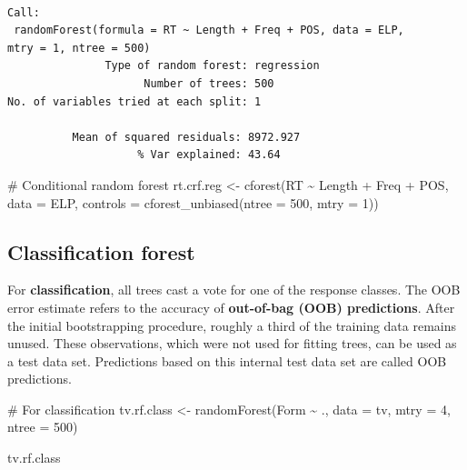 \documentclass[
  11pt,
  letterpaper,
  DIV=11,
  numbers=noendperiod]{scrreprt}
\newenvironment{Shaded}{\begin{snugshade}}{\end{snugshade}}
\newcommand{\AttributeTok}[1]{\textcolor[rgb]{0.40,0.45,0.13}{#1}}
\newcommand{\CommentTok}[1]{\textcolor[rgb]{0.37,0.37,0.37}{#1}}
\newcommand{\DecValTok}[1]{\textcolor[rgb]{0.68,0.00,0.00}{#1}}
\newcommand{\FunctionTok}[1]{\textcolor[rgb]{0.28,0.35,0.67}{#1}}
\newcommand{\NormalTok}[1]{\textcolor[rgb]{0.00,0.23,0.31}{#1}}
\newcommand{\OtherTok}[1]{\textcolor[rgb]{0.00,0.23,0.31}{#1}}
\newcommand{\SpecialCharTok}[1]{\textcolor[rgb]{0.37,0.37,0.37}{#1}}
\begin{document}
\begin{verbatim}

Call:
 randomForest(formula = RT ~ Length + Freq + POS, data = ELP,      mtry = 1, ntree = 500) 
               Type of random forest: regression
                     Number of trees: 500
No. of variables tried at each split: 1

          Mean of squared residuals: 8972.927
                    % Var explained: 43.64
\end{verbatim}

\begin{Shaded}
\begin{Highlighting}[]
\CommentTok{\# Conditional random forest}
\NormalTok{rt.crf.reg }\OtherTok{\textless{}{-}} \FunctionTok{cforest}\NormalTok{(RT }\SpecialCharTok{\textasciitilde{}}\NormalTok{ Length }\SpecialCharTok{+}\NormalTok{ Freq }\SpecialCharTok{+}\NormalTok{ POS, }\AttributeTok{data =}\NormalTok{ ELP, }
                    \AttributeTok{controls =} \FunctionTok{cforest\_unbiased}\NormalTok{(}\AttributeTok{ntree =} \DecValTok{500}\NormalTok{, }\AttributeTok{mtry =} \DecValTok{1}\NormalTok{))}
\end{Highlighting}
\end{Shaded}

\subsection{Classification forest}\label{classification-forest}

For \textbf{classification}, all trees cast a vote for one of the
response classes. The OOB error estimate refers to the accuracy of
\textbf{out-of-bag (OOB) predictions}. After the initial bootstrapping
procedure, roughly a third of the training data remains unused. These
observations, which were not used for fitting trees, can be used as a
test data set. Predictions based on this internal test data set are
called OOB predictions.

\begin{Shaded}
\begin{Highlighting}[]
\CommentTok{\# For classification}
\NormalTok{tv.rf.class }\OtherTok{\textless{}{-}} \FunctionTok{randomForest}\NormalTok{(Form }\SpecialCharTok{\textasciitilde{}}\NormalTok{ ., }\AttributeTok{data =}\NormalTok{ tv,}
                            \AttributeTok{mtry =} \DecValTok{4}\NormalTok{,}
                            \AttributeTok{ntree =} \DecValTok{500}\NormalTok{)}

\NormalTok{tv.rf.class}
\end{Highlighting}
\end{Shaded}
\end{document}
